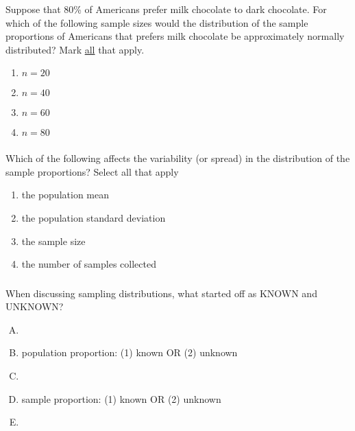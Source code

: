 \begin{frame}
\frametitle{\grp}
\begin{clicker}{Suppose that 80\% of Americans prefer milk chocolate to dark chocolate. For which of the following sample sizes would the distribution of the sample proportions of Americans that prefers milk chocolate be approximately normally distributed? Mark \underline{all} that apply.}
\begin{enumerate}
    \item
    $n=20$
    \item
    $n=40$
    \item
    $n=60$
    \item
    $n=80$
\end{enumerate}
\end{clicker}
\end{frame}


\begin{frame}
\frametitle{\grp}
\begin{clicker}{Which of the following affects the variability (or spread) in the distribution of the sample proportions?  Select all that apply}
\begin{enumerate}
    \item
    the population mean
    \item
    the population standard deviation
    \item
    the sample size
    \item
    the number of samples collected
\end{enumerate}
\end{clicker}
\end{frame}

\begin{frame}
\frametitle{\grp}
\begin{clicker}{When discussing sampling distributions, what started off as KNOWN and UNKNOWN?}
\begin{enumerate}[A.]
    \item[]
    \item
    population proportion: (1) known OR (2) unknown
    \item[]
    \item
    sample proportion: (1) known OR (2) unknown
    \item[]
\end{enumerate}
\end{clicker}
\end{frame}


